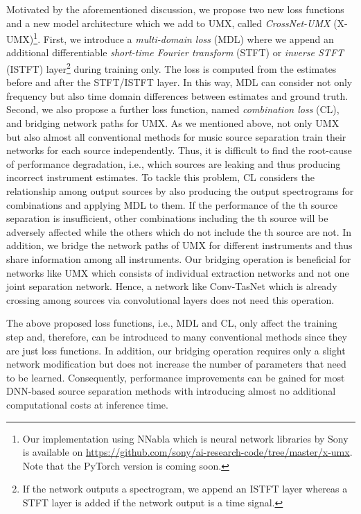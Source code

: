 \documentclass{article}
\begin{document}
Motivated by the aforementioned discussion, we propose two new loss functions and a new model architecture which we add to UMX, called \emph{CrossNet-UMX} (X-UMX)\footnote{Our implementation using NNabla which is neural network libraries by Sony is available on \url{https://github.com/sony/ai-research-code/tree/master/x-umx}. Note that the PyTorch version is coming soon.}.
First, we introduce a \emph{multi-domain loss} (MDL) where we append an additional differentiable \emph{short-time Fourier transform} (STFT) or \emph{inverse STFT} (ISTFT) layer\footnote{If the network outputs a spectrogram, we append an ISTFT layer whereas a STFT layer is added if the network output is a time signal.} during training only. The loss is computed from the estimates before and after the STFT/ISTFT layer.
In this way, MDL can consider not only frequency but also time domain differences between estimates and ground truth.
Second, we also propose a further loss function, named \emph{combination loss} (CL), and bridging network paths for UMX.
As we mentioned above, not only UMX but also almost all conventional methods for music source separation train their networks for each source independently.
Thus, it is difficult to find the root-cause of performance degradation, i.e., which sources are leaking and thus producing incorrect instrument estimates.
To tackle this problem, CL considers the relationship among output sources by also producing the output spectrograms for combinations and applying MDL to them. If the performance of the th source separation is insufficient, other combinations including the th source will be adversely affected while the others which do not include the th source are not.
In addition, we bridge the network paths of UMX for different instruments and thus share information among all instruments. Our bridging operation is beneficial for networks like UMX which consists of individual extraction networks and not one joint separation network.
Hence, a network like Conv-TasNet which is already crossing among sources via convolutional layers does not need this operation.


The above proposed loss functions, i.e., MDL and CL, only affect the training step and, therefore, can be introduced to many conventional methods since they are just loss functions.
In addition, our bridging operation requires only a slight network modification but does not increase the number of parameters that need to be learned.
Consequently, performance improvements can be gained for most DNN-based source separation methods with introducing almost no additional computational costs at inference time.
\end{document}
